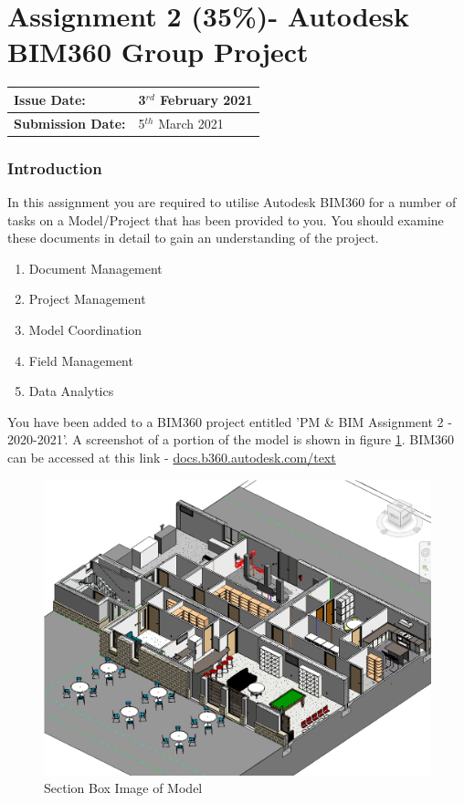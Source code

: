 
	

\part*{Assignment 2 (35\%)- Autodesk BIM360 Group Project}


\begin{tabularx}{\textwidth}{ |X|X| }
	\hline
	\textbf{Issue Date:} & 3$^{rd}$ February 2021\\
	\hline 
	\textbf{Submission Date:}  & 5$^{th}$ March 2021\\
	\hline
\end{tabularx}

\section*{Introduction}

In this assignment you are required to utilise Autodesk BIM360 for a number of tasks on a Model/Project that has been provided to you.  You should examine these documents in detail to gain an understanding of the project.\\

\begin{enumerate}
	\item Document Management 
	\item Project Management
	\item Model Coordination
	\item Field Management
	\item Data Analytics
\end{enumerate}

You have been added to a BIM360 project entitled 'PM \& BIM Assignment 2 - 2020-2021'.  A screenshot of a portion of the model is shown in figure \ref{fig:thumbnail}.  BIM360 can be accessed at this link - \href{https://docs.b360.autodesk.com/}{docs.b360.autodesk.com/text}

\begin{figure}
	\centering
	\includegraphics[width=0.7\linewidth]{RevitAssets/Thumbnail}
	\caption[Section Box Image of Model]{Section Box Image of Model}
	\label{fig:thumbnail}
\end{figure}





